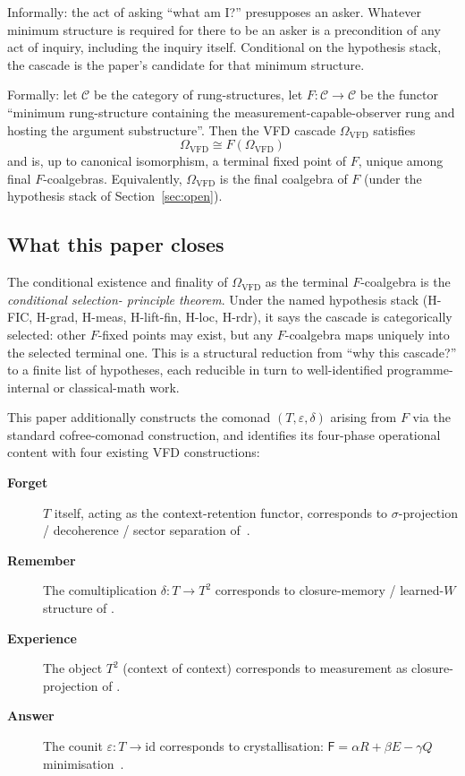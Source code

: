 \documentclass[11pt, a4paper]{amsart}
\theoremstyle{definition}
\newcommand{\catC}{\mathcal{C}}
\newcommand{\Omegacap}{\Omega_{\mathrm{VFD}}}
\newcommand{\Fcrystal}{\mathsf{F}}
\begin{document}
Informally: the act of asking ``what am I?'' presupposes an
asker. Whatever minimum structure is required for there to be
an asker is a precondition of any act of inquiry, including the
inquiry itself. Conditional on the hypothesis stack, the
cascade is the paper's candidate for that minimum structure.

Formally: let $\catC$ be the category of rung-structures, let
$F : \catC \to \catC$ be the functor ``minimum rung-structure
containing the measurement-capable-observer rung and hosting
the argument substructure''. Then the VFD cascade $\Omegacap$
satisfies
\[
    \Omegacap \cong F(\Omegacap)
\]
and is, up to canonical isomorphism, a terminal fixed point of
$F$, unique among final $F$-coalgebras. Equivalently,
$\Omegacap$ is the final coalgebra of $F$ (under the hypothesis
stack of Section~\ref{sec:open}).

\subsection{What this paper closes}

The conditional existence and finality of $\Omegacap$ as the
terminal $F$-coalgebra is the \emph{conditional selection-
principle theorem}. Under the named hypothesis stack (H-FIC,
H-grad, H-meas, H-lift-fin, H-loc, H-rdr), it says the cascade is
categorically selected: other $F$-fixed points may exist, but
any $F$-coalgebra maps uniquely into the selected terminal one.
This is a structural reduction from ``why this cascade?'' to
a finite list of hypotheses, each reducible in turn to
well-identified programme-internal or classical-math work.

This paper additionally constructs the comonad $(T, \varepsilon,
\delta)$ arising from $F$ via the standard cofree-comonad
construction, and identifies its four-phase operational content
with four existing VFD constructions:

\begin{description}
\item[\textbf{Forget}] $T$ itself, acting as the context-retention
  functor, corresponds to $\sigma$-projection / decoherence / sector
  separation of~\cite{PaperXXXI, PaperXLIV}.
\item[\textbf{Remember}] The comultiplication $\delta : T \to T^2$
  corresponds to closure-memory / learned-$W$ structure of
  \cite{PaperXXI, ACT-L1}.
\item[\textbf{Experience}] The object $T^2$ (context of context)
  corresponds to measurement as closure-projection of
  \cite{PaperXXXIII}.
\item[\textbf{Answer}] The counit $\varepsilon : T \to \mathrm{id}$
  corresponds to crystallisation: $\Fcrystal = \alpha R + \beta E -
  \gamma Q$ minimisation~\cite{VFDCrystallisation}.
\end{description}
\end{document}
